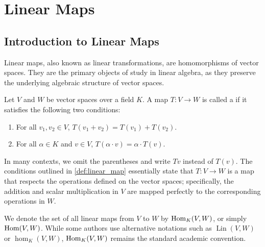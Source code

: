 \renewcommand{\thetheorem}{15.a.\arabic{theorem}}
\setcounter{theorem}{0}

\setcounter{chapter}{14} %
\chapter{Linear Maps}


\section{Introduction to Linear Maps}
\label{sec:intro_linear_maps}

Linear maps, also known as linear transformations, are homomorphisms of vector spaces. They are the primary objects of study in linear algebra, as they preserve the underlying algebraic structure of vector spaces.

\begin{definition}
\label{def:linear_map}
Let $V$ and $W$ be vector spaces over a field $K$. A map $T: V \to W$ is called a  if it satisfies the following two conditions:
\begin{enumerate}
    \item For all $v_1, v_2 \in V$, $T(v_1 + v_2) = T(v_1) + T(v_2)$.
    \item For all $\alpha \in K$ and $v \in V$, $T(\alpha \cdot v) = \alpha \cdot T(v)$.
\end{enumerate}
\end{definition}

\begin{remark}
\label{rem:linear_map_notation}
In many contexts, we omit the parentheses and write $Tv$ instead of $T(v)$. The conditions outlined in \cref{def:linear_map} essentially state that $T: V \to W$ is a map that respects the operations defined on the vector spaces; specifically, the addition and scalar multiplication in $V$ are mapped perfectly to the corresponding operations in $W$.

We denote the set of all linear maps from $V$ to $W$ by $\operatorname{Hom}_K(V, W)$, or simply $\operatorname{Hom}(V, W)$. While some authors use alternative notations such as $\operatorname{Lin}(V, W)$ or $\hom_K(V, W)$, $\operatorname{Hom}_K(V, W)$ remains the standard academic convention.
\end{remark}

